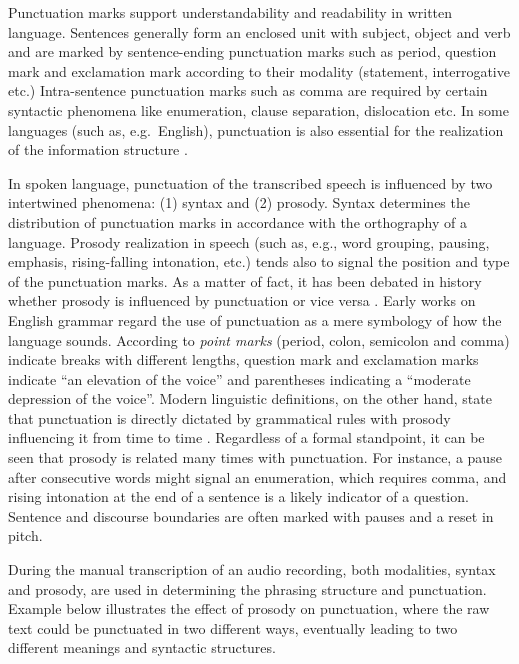 Punctuation marks support understandability and readability in written language. Sentences generally form an enclosed unit with subject, object and verb and are marked by sentence-ending punctuation marks such as period, question mark and exclamation mark according to their modality (statement, interrogative etc.) Intra-sentence punctuation marks such as comma are required by certain syntactic phenomena like enumeration, clause separation, dislocation etc. In some languages (such as, e.g.~English), punctuation is also essential for the realization of the information structure \citep{Moore2016}. 

In spoken language, punctuation of the transcribed speech is influenced by two intertwined phenomena: (1) syntax and (2) prosody. Syntax determines the distribution of punctuation marks in accordance with the orthography of a language. Prosody realization in speech (such as, e.g., word grouping, pausing, emphasis, rising-falling intonation, etc.) tends also to signal the position and type of the punctuation marks. As a matter of fact, it has been debated in history whether prosody is influenced by punctuation or vice versa \citep{wallace}. Early works on English grammar regard the use of punctuation as a mere symbology of how the language sounds. According to \cite{lowth} \textit{point marks} (period, colon, semicolon and comma) indicate breaks with different lengths, question mark and exclamation marks indicate ``an elevation of the voice'' and parentheses indicating a ``moderate depression of the voice''. Modern linguistic definitions, on the other hand, state that punctuation is directly dictated by grammatical rules with prosody influencing it from time to time \citep{algeo}. Regardless of a formal standpoint, it can be seen that prosody is related many times with punctuation. For instance, a pause after consecutive words might signal an enumeration, which requires comma, and rising intonation at the end of a sentence is a likely indicator of a question. Sentence and discourse boundaries are often marked with pauses and a reset in pitch. 

During the manual transcription of an audio recording, both modalities, syntax and prosody, are used in determining the phrasing structure and punctuation. Example below illustrates the effect of prosody on punctuation, where the raw text could be punctuated in two different ways, eventually leading to two different meanings and syntactic structures. 

